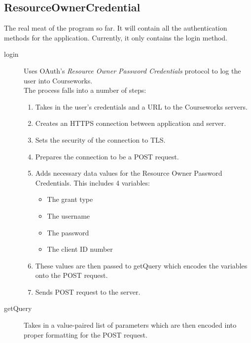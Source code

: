 \documentclass{article}
\begin{document}
\subsection{ResourceOwnerCredential}
The real meat of the program so far. It will contain all the authentication methods for the application. Currently, it only contains the login method.
\begin{description}
    \item[login] Uses OAuth's \emph{Resource Owner Password Credentials} protocol to log 
                 the user into Courseworks. \\
                 The process falls into a number of steps:
    \begin{enumerate}
        \item Takes in the user's credentials and a URL to the Courseworks servers.
        \item Creates an HTTPS connection between application and server.
        \item Sets the security of the connection to TLS.
        \item Prepares the connection to be a POST request.
        \item Adds necessary data values for the Resource Owner Password Credentials. This
              includes 4 variables:
        \begin{itemize}
            \item The grant type
            \item The username
            \item The password
            \item The client ID number
        \end{itemize}
        \item These values are then passed to getQuery which encodes the variables onto
              the POST request.
        \item Sends POST request to the server.
    \end{enumerate}
    \item[getQuery] Takes in a value-paired list of parameters which are then encoded into
                    proper formatting for the POST request.
\end{description}
 
\end{document}

